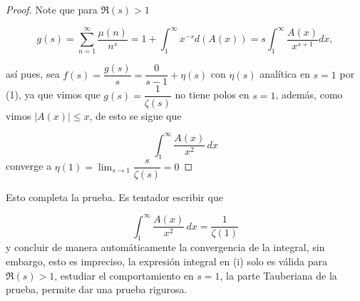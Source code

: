 \documentclass[12pt, a4paper]{article}
\begin{document}
\begin{proof}
    
Note que para $\Re(s)>1$

$$g(s)=\sum_{n=1}^{\infty}\dfrac{\mu(n)}{n^s}=1+\int_1^\infty x^{-s}d(A(x))=s\int_1^\infty\dfrac{A(x)}{x^{s+1}}dx,$$

así pues, sea $f(s)=\dfrac{g(s)}{s}=\dfrac{0}{s-1}+\eta(s)$ con $\eta(s)$ analítica en $s=1$ por (1), ya que vimos que $g(s)=\dfrac{1}{\zeta(s)}$ no tiene polos en $s=1$, además, como vimos $|A(x)|\leq x$, de esto se sigue que 

$$
\int_1^\infty \frac{A(x)}{x^2}\,dx
$$
converge a $\eta(1)=\lim_{s\to 1} \dfrac{s}{\zeta(s)}=0$
\end{proof}

Esto completa la prueba. Es tentador escribir que 

$$
\int_1^\infty \frac{A(x)}{x^2}\,dx=\dfrac{1}{\zeta(1)}
$$
 y concluir de manera automáticamente la convergencia de la integral, sin embargo, esto es impreciso, la expresión integral en (i) solo es válida para $\Re(s)>1$, estudiar el comportamiento en $s=1$, la parte Tauberiana de la prueba, permite dar una prueba rigurosa.
\end{document}
